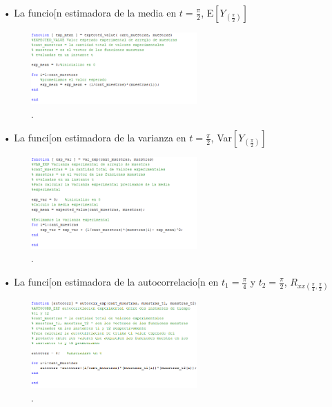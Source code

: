 \begin{enumerate}
\item[•] La funcio[n estimadora de la media en $t = \frac{\pi}{2}$, E$\left[ Y_{(\frac{\pi}{2})}\right]$
\begin{figure}[H]
\centering
	\includegraphics[width=0.6\textwidth, trim = {0 0 0 0},clip]{./ImagenesEjercicio1/expval.png}
	\caption{.}
	\label{fig:expval}
\end{figure}

\item[•] La funci[on estimadora de la varianza en $t = \frac{\pi}{2}$, Var$\left[Y_{(\frac{\pi}{2})}\right]$
\begin{figure}[H]
\centering
	\includegraphics[width=0.6\textwidth, trim = {0 0 0 0},clip]{./ImagenesEjercicio1/expvar.png}
	\caption{.}
	\label{fig:expvar}
\end{figure}

\item[•] La funci[on estimadora de la autocorrelacio[n en $t_1 = \frac{\pi}{4}$ y $t_2 = \frac{\pi}{2}$, $R_{xx(\frac{\pi}{4},\frac{\pi}{2})}$
\begin{figure}[H]
\centering
	\includegraphics[width=0.6\textwidth, trim = {0 0 0 0},clip]{./ImagenesEjercicio1/autocorr.png}
	\caption{.}
	\label{fig:autocorr}
\end{figure}


\end{enumerate}

